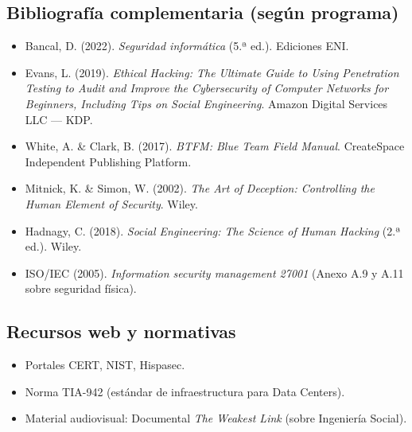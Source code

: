 \documentclass[11pt,a4paper]{article}
\begin{document}
\subsection{Bibliografía complementaria (según programa)}
\begin{itemize}[leftmargin=*]
  \item Bancal, D. (2022). \textit{Seguridad informática} (5.ª ed.). Ediciones ENI.
  \item Evans, L. (2019). \textit{Ethical Hacking: The Ultimate Guide to Using Penetration Testing to Audit and Improve the Cybersecurity of Computer Networks for Beginners, Including Tips on Social Engineering}. Amazon Digital Services LLC --- KDP.
  \item White, A. \& Clark, B. (2017). \textit{BTFM: Blue Team Field Manual}. CreateSpace Independent Publishing Platform.
  \item Mitnick, K. \& Simon, W. (2002). \textit{The Art of Deception: Controlling the Human Element of Security}. Wiley.
  \item Hadnagy, C. (2018). \textit{Social Engineering: The Science of Human Hacking} (2.ª ed.). Wiley.
  \item ISO/IEC (2005). \textit{Information security management 27001} (Anexo A.9 y A.11 sobre seguridad física).
\end{itemize}

\subsection{Recursos web y normativas}
\begin{itemize}[leftmargin=*]
  \item Portales CERT, NIST, Hispasec.
  \item Norma TIA-942 (estándar de infraestructura para Data Centers).
  \item Material audiovisual: Documental \textit{The Weakest Link} (sobre Ingeniería Social).
\end{itemize}
\end{document}
